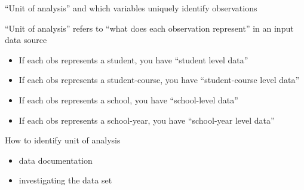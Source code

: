 \documentclass[8pt,ignorenonframetext,dvipsnames]{beamer}
\providecommand{\tightlist}{%
  \setlength{\itemsep}{0pt}\setlength{\parskip}{0pt}}
\begin{document}
\begin{frame}{``Unit of analysis'' and which variables uniquely identify
observations}

``Unit of analysis'' refers to ``what does each observation represent''
in an input data source

\begin{itemize}
\tightlist
\item
  If each obs represents a student, you have ``student level data''
\item
  If each obs represents a student-course, you have ``student-course
  level data''
\item
  If each obs represents a school, you have ``school-level data''
\item
  If each obs represents a school-year, you have ``school-year level
  data''
\end{itemize}

How to identify unit of analysis

\begin{itemize}
\tightlist
\item
  data documentation
\item
  investigating the data set
\end{itemize}

\end{frame}
\end{document}
